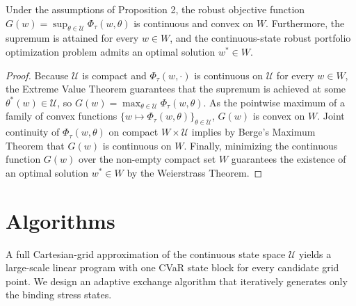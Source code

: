 \documentclass[smallcondensed]{svjour3}
\begin{document}
\begin{theorem}
Under the assumptions of Proposition 2, the robust objective function $G(w) = \sup_{\theta \in \mathcal{U}} \Phi_\tau(w, \theta)$ is continuous and convex on $W$. Furthermore, the supremum is attained for every $w \in W$, and the continuous-state robust portfolio optimization problem admits an optimal solution $w^* \in W$.
\end{theorem}

\begin{proof}
Because $\mathcal{U}$ is compact and $\Phi_\tau(w, \cdot)$ is continuous on $\mathcal{U}$ for every $w \in W$, the Extreme Value Theorem guarantees that the supremum is achieved at some $\theta^*(w) \in \mathcal{U}$, so $G(w) = \max_{\theta \in \mathcal{U}} \Phi_\tau(w, \theta)$. As the pointwise maximum of a family of convex functions $\{w \mapsto \Phi_\tau(w, \theta)\}_{\theta \in \mathcal{U}}$, $G(w)$ is convex on $W$. Joint continuity of $\Phi_\tau(w, \theta)$ on compact $W \times \mathcal{U}$ implies by Berge's Maximum Theorem that $G(w)$ is continuous on $W$. Finally, minimizing the continuous function $G(w)$ over the non-empty compact set $W$ guarantees the existence of an optimal solution $w^* \in W$ by the Weierstrass Theorem.
\end{proof}


\section{Algorithms}\label{sec:algorithms}
A full Cartesian-grid approximation of the continuous state space $\mathcal{U}$ yields a large-scale linear program with one CVaR state block for every candidate grid point. We design an adaptive exchange algorithm that iteratively generates only the binding stress states.
\end{document}
